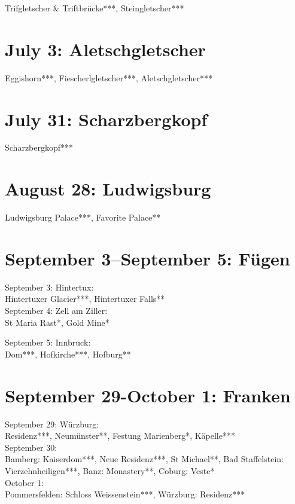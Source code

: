 Trifgletscher \& Triftbr\"ucke***, Steingletscher***

\section{July 3: Aletschgletscher}
\label{Aletsch2011}

Eggishorn***, Fiescherlgletscher***, Aletschgletscher***

\section{July 31: Scharzbergkopf}
\label{Saasalmagell2011}

Scharzbergkopf***

\section{August 28: Ludwigsburg}
\label{Ludwigsburg2011}

Ludwigsburg Palace***, Favorite Palace**

\section{September 3--September 5: F\"ugen}
\label{Tirol2011}

September 3: Hintertux:\\
Hintertuxer Glacier***, Hintertuxer Falls**\\

September 4: Zell am Ziller:\\
St Maria Rast*, Gold Mine*

September 5: Innbruck:\\
Dom***, Hofkirche***, Hofburg**

\section{September 29-October 1: Franken}
\label{Franken2011}

September 29: W\"urzburg:\\
Residenz***, Neum\"unster**, Festung Marienberg*, K\"apelle***\\

September 30:\\
Bamberg: Kaiserdom***, Neue Residenz***, St Michael**, Bad Staffelstein: Vierzehnheiligen***, Banz: Monastery**, Coburg: Veste*\\

October 1:\\
Pommersfelden: Schloss Weissenstein***, W\"urzburg: Residenz***

